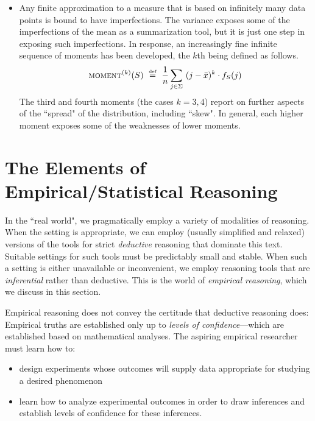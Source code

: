 \begin{itemize}
\medskip\item
Any finite approximation to a measure that is based on infinitely many data points is bound to have imperfections.  The variance exposes some of the imperfections of the mean as a summarization tool, but it is just one step in exposing such imperfections.  In response, an increasingly fine infinite sequence of moments has been developed, the $k$th being defined as follows.
\[
\mbox{\sc moment}^{(k)}(S) \ \stackrel{\mbox{{\tiny def}}}{=} \ {1 \over n} \sum_{j \in \Sigma} \ (j - \bar{x})^k \cdot f_S(j)
\]
The third and fourth moments (the cases $k = 3,4$) report on further aspects of the ``spread" of the distribution, including ``skew".  In general, each higher moment exposes some of the weaknesses of lower moments.
\end{itemize}


\section{The Elements of Empirical/Statistical Reasoning}
\label{sec:empirical}

In the ``real world", we pragmatically employ a variety of modalities of reasoning.  When the setting is appropriate, we can employ (usually simplified and relaxed) versions of the tools for strict {\em deductive} reasoning that dominate this text.  Suitable settings for such tools must be predictably small and stable.  When such a setting is either unavailable or inconvenient, we employ reasoning tools that are {\em inferential} rather than deductive.  This is the world of {\em empirical reasoning}, which we discuss in this section.

\medskip

Empirical reasoning does not convey the certitude that deductive reasoning does:  Empirical truths are established only up to {\em levels of confidence}---which are established based on mathematical analyses.  The aspiring empirical researcher must learn how to:
\begin{itemize}
\item
design experiments whose outcomes will supply data appropriate for studying a desired phenomenon
\medskip\item
learn how to analyze experimental outcomes in order to draw inferences and establish levels of confidence for these inferences.
\end{itemize}

\smallskip

